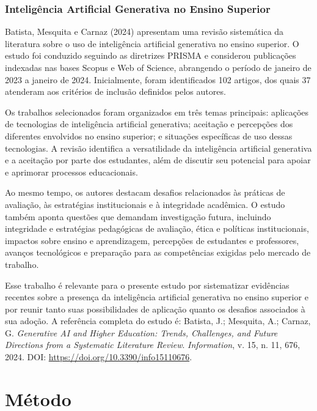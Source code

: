 \documentclass{eic-bcc-tcc}
\begin{document}
\subsection{Inteligência Artificial Generativa no Ensino Superior}

Batista, Mesquita e Carnaz (2024) apresentam uma revisão sistemática da literatura sobre o uso de inteligência artificial generativa no ensino superior. O estudo foi conduzido seguindo as diretrizes PRISMA e considerou publicações indexadas nas bases Scopus e Web of Science, abrangendo o período de janeiro de 2023 a janeiro de 2024. Inicialmente, foram identificados 102 artigos, dos quais 37 atenderam aos critérios de inclusão definidos pelos autores.

Os trabalhos selecionados foram organizados em três temas principais: aplicações de tecnologias de inteligência artificial generativa; aceitação e percepções dos diferentes envolvidos no ensino superior; e situações específicas de uso dessas tecnologias. A revisão identifica a versatilidade da inteligência artificial generativa e a aceitação por parte dos estudantes, além de discutir seu potencial para apoiar e aprimorar processos educacionais.

Ao mesmo tempo, os autores destacam desafios relacionados às práticas de avaliação, às estratégias institucionais e à integridade acadêmica. O estudo também aponta questões que demandam investigação futura, incluindo integridade e estratégias pedagógicas de avaliação, ética e políticas institucionais, impactos sobre ensino e aprendizagem, percepções de estudantes e professores, avanços tecnológicos e preparação para as competências exigidas pelo mercado de trabalho.

Esse trabalho é relevante para o presente estudo por sistematizar evidências recentes sobre a presença da inteligência artificial generativa no ensino superior e por reunir tanto suas possibilidades de aplicação quanto os desafios associados à sua adoção. A referência completa do estudo é: Batista, J.; Mesquita, A.; Carnaz, G. \textit{Generative AI and Higher Education: Trends, Challenges, and Future Directions from a Systematic Literature Review}. \textit{Information}, v. 15, n. 11, 676, 2024. DOI: \url{https://doi.org/10.3390/info15110676}.



\chapter{Método}
\label{cha:metodo}
\end{document}
